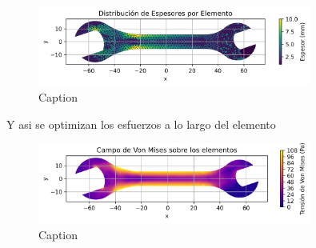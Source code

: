 \documentclass{article}  %
\begin{document}
\begin{figure}[H]
  \centering
  \includegraphics[width=0.8\textwidth]{GRAFICOS/espesores_espesores.png}
  \caption{Caption}
  \label{fig:von_mises}
\end{figure}

Y asi se optimizan los esfuerzos a lo largo del elemento

\begin{figure}[H]
  \centering
  \includegraphics[width=0.8\textwidth]{GRAFICOS/Topo_von_mises.png}
  \caption{Caption}
  \label{fig:analisis_estructural}
\end{figure}
\end{document}

